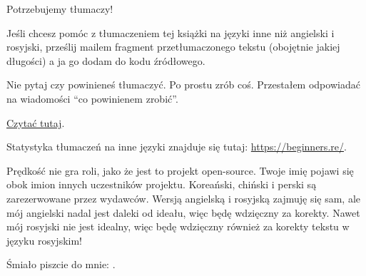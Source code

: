 \vspace*{\fill}

\Huge Potrzebujemy tłumaczy!
\normalsize

\bigskip
\bigskip
\bigskip

Jeśli chcesz pomóc z tłumaczeniem tej książki na języki inne niż angielski i rosyjski,
prześlij mailem fragment przetłumaczonego tekstu (obojętnie jakiej długości) a ja go dodam do kodu źródłowego.

Nie pytaj czy powinieneś tłumaczyć. Po prostu zrób coś. Przestałem odpowiadać na wiadomości ``co powinienem zrobić''.

\href{\RepoURL/Translation.md}{Czytać tutaj}.

Statystyka tłumaczeń na inne języki znajduje się tutaj: \url{https://beginners.re/}.

Prędkość nie gra roli, jako że jest to projekt open-source.
Twoje imię pojawi się obok imion innych uczestników projektu.
Koreański, chiński i perski są zarezerwowane przez wydawców.
Wersją angielską i rosyjską zajmuję się sam, ale mój angielski nadal jest daleki od ideału, więc będę wdzięczny za korekty.
Nawet mój rosyjski nie jest idealny, więc będę wdzięczny również za korekty tekstu w języku rosyjskim!

Śmiało piszcie do mnie: \GTT{\EMAILS}.

\vspace*{\fill}
\vfill

